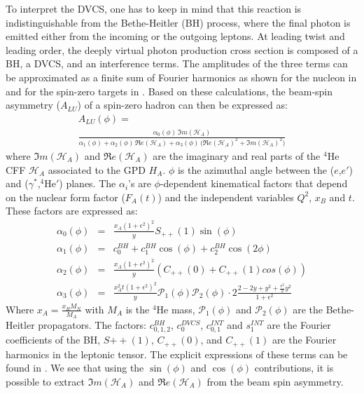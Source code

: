 \documentclass[nofootinbib,twocolumn,showpacs,prl,superscriptaddress,secnumarabic,amssymb,nobibnotes,aps,floatfix,preprint]{revtex4}
\begin{document}
To interpret the DVCS, one has to keep in mind that this reaction is 
indistinguishable from the Bethe-Heitler (BH) process, where the final photon 
is emitted either from the incoming or the outgoing leptons. At leading twist 
and leading order, the deeply virtual photon production cross section is 
composed of a BH, a DVCS, and an interference terms. The amplitudes of the 
three terms can be approximated as a finite sum of Fourier harmonics as shown 
for the nucleon in \cite{Belitsky:2001ns} and for the spin-zero targets in 
\cite{Kirchner:2003wt,Belitsky:2008bz}. Based on these calculations, the 
beam-spin asymmetry ($A_{LU}$) of a spin-zero hadron can then be expressed as:
\small
\begin{equation}
\begin{split}
A_{LU}(\phi) =~~~~~~~~~~~~~~~~~~~~~~~~~~~~~~~~~~~~~~~~~~~~~~~~~~~~~~~~~\\
 \frac{\alpha_{0}(\phi) \, \Im m(\mathcal{H}_{A})}
{\alpha_{1}(\phi) + \alpha_{2}(\phi) \, \Re e(\mathcal{H}_{A}) + \alpha_{3}(\phi) \, 
\big( 
\Re e(\mathcal{H}_{A})^{2} + \Im m(\mathcal{H}_{A})^{2} \big)}
\label{eq:A_LU-coh}
\end{split}
\end{equation}
\normalsize
where $\Im m(\mathcal{H}_{A})$ and $\Re e(\mathcal{H}_{A})$ are the imaginary 
and real parts of the $^4$He CFF $\mathcal{H}_{A}$ associated to the GPD $H_A$. 
$\phi$ is the azimuthal angle between the ($e$,$e'$) and 
($\gamma^{*}$,$^4$He$'$) planes. The $\alpha_{i}$'s are $\phi$-dependent 
kinematical factors that depend on the nuclear form factor ($F_{A}(t)$) and the 
independent variables $Q^2$, $x_{B}$ and $t$. These factors are expressed as:
\small
\begin{eqnarray}
   \alpha_0 (\phi) & = &\frac{x_{A}(1+\epsilon^2)^2}{y} S_{++}(1) \sin(\phi)\\
    \alpha_1 (\phi) & = & c_0^{BH}+c_1^{BH} \cos({\phi})+c_2^{BH} \cos(2\phi)\\ 
   \alpha_2 (\phi) & = & \frac{x_{A}(1+\epsilon^2)^2}{y}  \left( C_{++}(0) +  
C_{++}(1) cos(\phi) \right)\\
\alpha_3 (\phi) &=& \frac{x^{2}_{A}t(1+\epsilon^2)^2}{y} {\mathcal P}_1(\phi) 
{\mathcal P}_2(\phi) \cdot 2 \frac{2-2y+y^2 + \frac{\epsilon^2}{2}y^2}{1 + 
\epsilon^2}
\end{eqnarray}
\normalsize
Where $x_{A} = \frac{x_{B}M_{N}}{M_{A}}$ with $M_{A}$ is the $^4$He mass, 
$\mathcal{P}_1(\phi)$ and $\mathcal {P}_2(\phi)$ are the Bethe-Heitler
propagators. The factors: $c_{0,1,2}^{BH}$, $c_0^{DVCS}$, $c_{0,1}^{INT}$ and
$s_1^{INT}$ are the Fourier coefficients of the BH, $S{++}(1)$, $C_{++}(0)$, 
and $C_{++}(1)$ are the Fourier harmonics in the leptonic tensor. The 
explicit expressions of these terms can be found in \cite{Belitsky:2008bz}. 
We see that using the $\sin(\phi)$ and $\cos(\phi)$ contributions, it is 
possible to extract 
$\Im m(\mathcal{H}_{A})$ and $\Re e(\mathcal{H}_{A})$ from the beam spin
asymmetry. 
\end{document}
